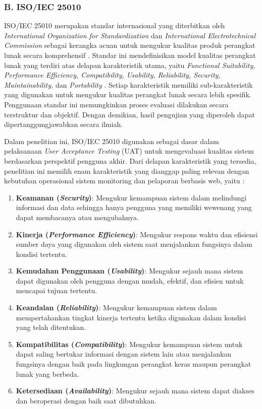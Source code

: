 \subsubsection*{B. ISO/IEC 25010} \label{II.ISO}
ISO/IEC 25010 merupakan standar internasional yang diterbitkan oleh \textit{International Organization for Standardization} dan \textit{International Electrotechnical Commission} sebagai kerangka acuan untuk mengukur kualitas produk perangkat lunak secara komprehensif \cite{lamada2024iso}. Standar ini mendefinisikan model kualitas perangkat lunak yang terdiri atas delapan karakteristik utama, yaitu \textit{Functional Suitability, Performance Efficiency, Compatibility, Usability, Reliability, Security, Maintainability,} dan \textit{Portability} \cite{lamada2024iso}. Setiap karakteristik memiliki sub-karakteristik yang digunakan untuk mengukur kualitas perangkat lunak secara lebih spesifik. Penggunaan standar ini memungkinkan proses evaluasi dilakukan secara terstruktur dan objektif. Dengan demikian, hasil pengujian yang diperoleh dapat dipertanggungjawabkan secara ilmiah.\par

Dalam penelitian ini, ISO/IEC 25010 digunakan sebagai dasar dalam pelaksanaan \textit{User Acceptance Testing} (UAT) untuk mengevaluasi kualitas sistem berdasarkan perspektif pengguna akhir. Dari delapan karakteristik yang tersedia, penelitian ini memilih enam karakteristik yang dianggap paling relevan dengan kebutuhan operasional sistem monitoring dan pelaporan berbasis web, yaitu \cite{lamada2024iso}:
\begin{enumerate}[noitemsep]
    \item \textbf{Keamanan (\textit{Security})}: Mengukur kemampuan sistem dalam melindungi informasi dan data sehingga hanya pengguna yang memiliki wewenang yang dapat membacanya atau mengubahnya.
    \item \textbf{Kinerja (\textit{Performance Efficiency})}: Mengukur respons waktu dan efisiensi sumber daya yang digunakan oleh sistem saat menjalankan fungsinya dalam kondisi tertentu.
    \item \textbf{Kemudahan Penggunaan (\textit{Usability})}: Mengukur sejauh mana sistem dapat digunakan oleh pengguna dengan mudah, efektif, dan efisien untuk mencapai tujuan tertentu.
    \item \textbf{Keandalan (\textit{Reliability})}: Mengukur kemampuan sistem dalam mempertahankan tingkat kinerja tertentu ketika digunakan dalam kondisi yang telah ditentukan.
    \item \textbf{Kompatibilitas (\textit{Compatibility})}: Mengukur kemampuan sistem untuk dapat saling bertukar informasi dengan sistem lain atau menjalankan fungsinya dengan baik pada lingkungan perangkat keras maupun perangkat lunak yang berbeda.
    \item \textbf{Ketersediaan (\textit{Availability})}: Mengukur sejauh mana sistem dapat diakses dan beroperasi dengan baik saat dibutuhkan.
\end{enumerate}

